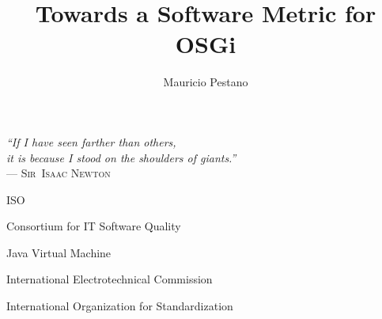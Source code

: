 \documentclass[cic,tc,english]{iiufrgs} %
\title{Towards a Software Metric for OSGi}
\author{Mauricio Pestano}{Rafael}
\begin{document}
\maketitle
\clearpage
\begin{flushright}
\mbox{}\vfill
{\sffamily\itshape
``If I have seen farther than others,\\
it is because I stood on the shoulders of giants.''\\}
--- \textsc{Sir~Isaac Newton}
\end{flushright}





\tableofcontents





\listoffigures

\listoftables

\begin{listofabbrv}{ISO}
        \item[CISQ] Consortium for IT Software Quality 
        \item[JVM] Java Virtual Machine
        \item[IEC] International Electrotechnical Commission
        \item[ISO] International Organization for Standardization
\end{listofabbrv}





 




\end{document}
